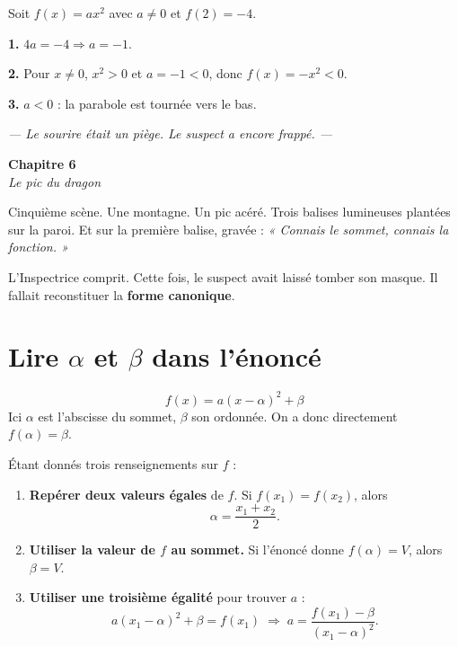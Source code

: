 \documentclass[11pt,a4paper]{article}
\newcommand{\chapterheader}[2]{%
  \clearpage
  \begin{tcolorbox}[
    enhanced,
    colback=ink, colframe=ink,
    interior style={top color=ink, bottom color=charcoal, shading angle=90},
    boxrule=0pt, arc=0pt,
    left=18pt, right=18pt, top=14pt, bottom=14pt,
    width=\textwidth,
  ]
    {\color{white}\Huge\bfseries #1}\\[6pt]
    {\color{silver}\large\itshape #2}
  \end{tcolorbox}
  \vspace{6pt}
}
\begin{document}
\begin{rapport}
Soit $f(x) = ax^2$ avec $a \neq 0$ et $f(2) = -4$.

\textbf{1.} $4a = -4 \Rightarrow a = -1$.

\textbf{2.} Pour $x \neq 0$, $x^2 > 0$ et $a = -1 < 0$, donc $f(x) = -x^2 < 0$.

\textbf{3.} $a < 0$ : la parabole est tournée vers le bas.
\end{rapport}

\vfill
\begin{center}
\textcolor{slate}{\itshape\small — Le sourire était un piège. Le suspect a encore frappé. —}
\end{center}

\chapterheader{Chapitre 6}{Le pic du dragon}

Cinquième scène. Une montagne. Un pic acéré. Trois balises lumineuses plantées sur la paroi. Et sur la première balise, gravée : \emph{« Connais le sommet, connais la fonction. »}

L'Inspectrice comprit. Cette fois, le suspect avait laissé tomber son masque. Il fallait reconstituer la \textbf{forme canonique}.

\section{Lire \texorpdfstring{$\alpha$}{alpha} et \texorpdfstring{$\beta$}{beta} dans l'énoncé}

\begin{indice}
\[
  f(x) = a(x-\alpha)^2 + \beta
\]
Ici $\alpha$ est l'abscisse du sommet, $\beta$ son ordonnée. On a donc directement $f(\alpha) = \beta$.
\end{indice}

\begin{methode}
Étant donnés trois renseignements sur $f$ :
\begin{enumerate}[leftmargin=*]
  \item \textbf{Repérer deux valeurs égales} de $f$. Si $f(x_1) = f(x_2)$, alors
        \[
          \alpha = \frac{x_1+x_2}{2}.
        \]
  \item \textbf{Utiliser la valeur de $f$ au sommet.} Si l'énoncé donne $f(\alpha) = V$, alors $\beta = V$.
  \item \textbf{Utiliser une troisième égalité} pour trouver $a$ :
        \[
          a(x_1-\alpha)^2 + \beta = f(x_1) \;\Longrightarrow\; a = \frac{f(x_1) - \beta}{(x_1-\alpha)^2}.
        \]
\end{enumerate}
\end{methode}
\end{document}
